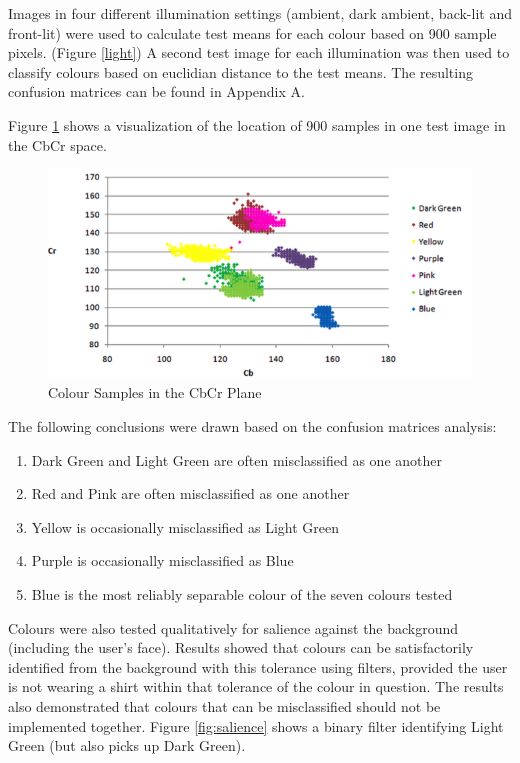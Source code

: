 \documentclass[12pt]{article}
\begin{document}
Images in four different illumination settings (ambient, dark ambient, back-lit and front-lit) were used to calculate test means for each colour based on 900 sample pixels. (Figure \ref{light}) A second test image for each illumination was then used to classify colours based on euclidian distance to the test means. The resulting confusion matrices can be found in Appendix A.

Figure \ref{fig:YUVTest} shows a visualization of the location of 900 samples in one test image in the CbCr space. 

\begin{figure}[h]
  \centering
  \includegraphics[scale=1]{YUVTest.png}
  \caption{Colour Samples in the CbCr Plane}
  \label{fig:YUVTest}
\end{figure}

The following conclusions were drawn based on the confusion matrices analysis: 
\begin{enumerate}
	\item Dark Green and Light Green are often misclassified as one another 
	\item Red and Pink are often misclassified as one another
	\item Yellow is occasionally misclassified as Light Green
	\item Purple is occasionally misclassified as Blue
	\item Blue is the most reliably separable colour of the seven colours tested
\end{enumerate}

Colours were also tested qualitatively for salience against the background (including the user’s face). Results showed that colours can be satisfactorily identified from the background with this tolerance using filters, provided the user is not wearing a shirt within that tolerance of the colour in question. The results also demonstrated that colours that can be misclassified should not be implemented together. Figure \ref{fig:salience} shows a binary filter identifying Light Green (but also picks up Dark Green). 
\end{document}
